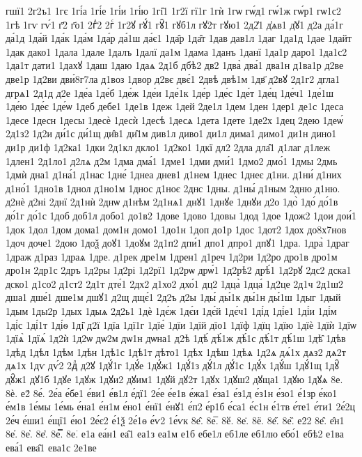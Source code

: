 {гшї1
2г2ъ1
1гє
1гі́а
1гі́е
1гі́и
1гі́ю
1гі̑1
1г2ї
гї1г
1гѝ
1гѡ
гѡ́д1
гѡ́1ж
гѡ́р1
гѡ1с2
1гѣ
1гѵ
гѵ́1
г҃2
г҃о1
2гⷣ2
2гⷭ
1г2ꙋ
гꙋ́1
гꙋ̑1
гꙋб1л
гꙋ2т
гꙋю1
2д2̾1
д̾ѧв1
д̾ꙋ1
д2а
да́1г
да́1д
1да́й
1да́к
1да́м
1да́р
да́1ш
да́є1
1да̑р
1да̑т
1дав
дав1л
1даг
1да1д
1дае
1дайт
1дак
дако1
1дала
1дале
1далъ
1далї
да1м
1дама
1данъ
1данї
1да1р
даро1
1да1с2
1да1т
дати1
1дахꙋ
1даш
1даю
1даѧ
2д1б
дбѣ2
дв2
1два̀
два́1
два1н
д1ва1р
д2ве
две1р
1д2ви
дви́8г7ла
д1воз
1двор
д2вє
двє́1
2двѣ
двѣ1м
1дв҃
д2вꙋ
2д1г2
дгла1
дгрѧ1
2д1д
д2е
1де́а
1де́б
1де́ж
1де́и
1де́1к
1де́р
1де́с
1де́т
1де́ц
1де́ч1
1де́1ш
1де́ю
1де́є
1де́ѡ
1деб
дебе1
1де1в
1деж
1дей
2де1л
1дем
1ден
1дер1
де1с
1деса
1десе
1десн
1десы
1десѐ
1десѝ
1десѣ
1десѧ
1дета
1дете
1де2х
1дец
2дею
1деѡ́
2д1з2
1д2и
ди́1с
ди́1щ
ди̑в1
ди̑1м
див1л
диво1
ди1л
дима1
димо1
ди1н
дино1
ди1р
ди1ф
1д2ка1
1дки
2д1кл
дкло1
1д2ко1
1дкї
дл2
2дла
дла̑1
д1лаг
д1леж
1длен1
2д1ло1
д2лѧ
д2м
1дма
дма́1
1дме1
1дми
дми́1
1дмо2
дмо́1
1дмы
2дмь
1дмѝ
дна1
д1на́1
д1нас
1дне́
1днеа
днев1
д1нем
1днес
1днеє
д1ни.
д1ни́
д1них
д1но́1
1дно1в
1днол
д1но1м
1днос
д1ноє
2днс
1дны.
д1ны́
д1ным
2дню
д1ню.
д2нѐ
д2ні
2днї
2д1нѝ
2днѡ
д1нѣм
2д1нѧ1
днꙋ1
1днꙋе
1днꙋи
д2о
1до̀
1до́
до́1в
до́1г
до́1с
1доб
доб1л
добо1
до1в2
1дове
1дово
1довы
1дод
1дое
1дож2
1дои
дои́1
1док
1дол
1дом
дома1
дом1н
домо1
1до1н
1доп
до1р
1дос
1дот2
1дох
до8х7нов
1доч
доче1
2дою
1доѯ
доꙋ1
1доꙋм
2д1п2
дпи́1
дпо1
дпро1
дпꙋ1
1дра.
1дра̀
1драг
1драж
д1раз
1драѧ
1дре.
д1рек
дре1м
1дрен1
д1реч
1д2ри
1д2ро
дро1в
дро1м
дро1н
2др1с
2дръ
1д2ры
1д2рі
1д2рї1
1д2рѡ
дрѡ́1
1д2рѣ2
дрѣ́1
1д2рꙋ
2дс2
дска1
дско1
д1со2
д1ст2
2д1т
дте́1
2дх2
д1хо2
дхо́1
дц2
1дца̀
1дца́
1д2це
2д1ч
2д1ш2
дша1
дше́1
дше1м
дшꙋ1
д2щ
дщє́1
2д2ъ
д2ы
1ды́
ды́1к
ды́1н
ды́1ш
1дыг
1дый
1дым
1ды2р
1дых
1дыѧ
2д2ь1
1дѐ
1дє́ж
1дє́и
1дє́й
1дє́ч1
1ді́д
1ді́е1
1ді́и
1ді́м
1ді́с
1ді́1т
1ді́ѳ
1ді̑
д2ї
1дїа
1дї1г
1дїе́
1дїи
1дїй
дїо1
1дїф
1дїц
1дїю
1дїѐ
1дїѝ
1дїѡ
1дїѧ̀
1дїѧ́
1д2ѝ
1д2ѡ
дѡ2м
дѡ1н
дѡна1
д2ѣ
1дѣ́
дѣ́1ж
дѣ́1с
дѣ́1т
дѣ́1ш
1дѣ̑
1дѣв
1дѣд
1дѣл
1дѣм
1дѣн
1дѣ1с
1дѣ1т
дѣто1
1дѣх
1дѣш
1дѣѧ
1д2ѧ
дѧ́1х
дѧз2
дѧ2т
дѧ1х
1дѵ
дѵ́2
2дⷧ
д2ꙋ
1дꙋ́1г
1дꙋ́е
1дꙋ́ж1
1дꙋ́1з
дꙋ́1л
дꙋ́1с
1дꙋ́х
1дꙋ́ш
1дꙋ́1щ
1дꙋ̑
дꙋ̑ж1
дꙋ1б
1дꙋе
1дꙋж
1дꙋи2
дꙋим1
1дꙋй
дꙋ2т
1дꙋх
1дꙋш2
дꙋща1
1дꙋю
1дꙋѧ
8е.
8ѐ.
е2́
8е́.
2е́а
е́бе1
е́ви1
е́в1л
е́дї1
2е́е
е́е1в
е́жа1
е́за1
е́з1д
е́з1н
е́зо1
е́1зр
е́ко1
е́м1в
1е́мы
1е́мь
е́на1
е́н1м
е́но1
е́нї1
е́нꙋ1
е́п2
е́р1б
е́са1
е́с1н
е́1тв
е́те1
е́ти1
2е́2ц
2е́ч
е́ши1
е́щї1
е́ю1
2е́є2
е́1ѯ
2е́1ѳ
е́ѵ2
1е́ѵк
8е̂.
8е̅.
8ӗ.
8е̇.
8ё.
8е̋.
8е̏.
е2̑2
8е̑.
е̑н1
8е̓.
8е̔.
8е̾.
8е̿.
8е͘.
е1а
еа́н1
еа̑1
еа1з
еа1м
е1б
ебе1л
еб1ле
еб1лю
ебо́1
ебѣ2
е1ва
ева́1
ева̑1
ева1с
2е1ве
}
